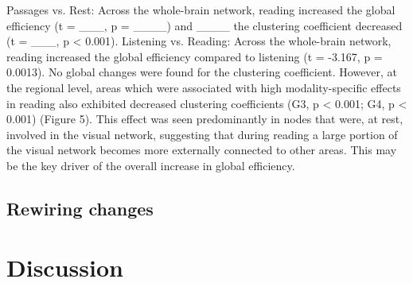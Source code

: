 Passages vs. Rest: Across the whole-brain network, reading increased the global efficiency (t = ___, p = ____) and ____ the clustering coefficient decreased (t = ___, p < 0.001).
Listening vs. Reading: Across the whole-brain network, reading increased the global efficiency compared to listening (t = -3.167, p = 0.0013). No global changes were found for the clustering coefficient. However, at the regional level, areas which were associated with high modality-specific effects in reading also exhibited decreased clustering coefficients (G3, p < 0.001; G4, p < 0.001) (Figure 5). This effect was seen predominantly in nodes that were, at rest, involved in the visual network, suggesting that during reading a large portion of the visual network becomes more externally connected to other areas. This may be the key driver of the overall increase in global efficiency.

\subsection{Rewiring changes}



\section{Discussion}